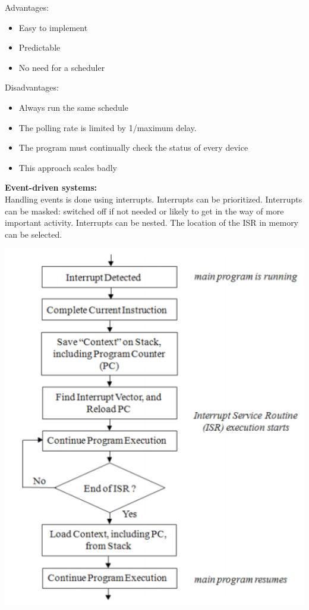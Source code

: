 Advantages:
\begin{itemize}
    \item Easy to implement
    \item Predictable
    \item No need for a scheduler
\end{itemize}
Disadvantages:
\begin{itemize}
    \item Always run the same schedule
    \item The polling rate is limited by 1/maximum delay.
    \item The program must continually check the status of every device
    \item This approach scales badly
\end{itemize}
\textbf{Event-driven systems:}\\
Handling events is done using interrupts. Interrupts can be prioritized.
Interrupts can be masked: switched off if not needed or likely to get in the way of more
important activity. Interrupts can be nested. The location of the ISR in memory can be selected.\\
\begin{minipage}{.49\columnwidth}
    \centering
    \includegraphics[width=\linewidth]{images/interrupt1.png}
\end{minipage}
